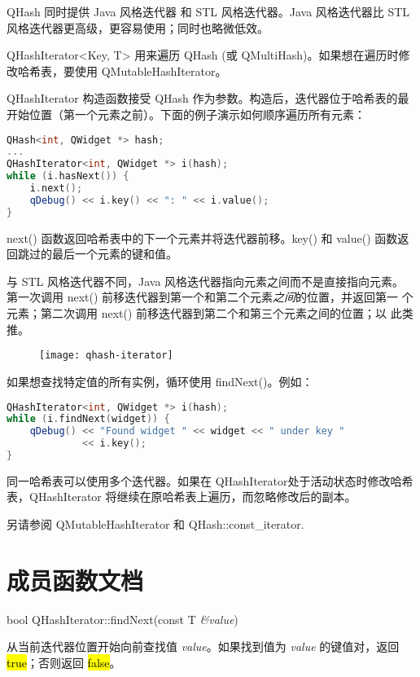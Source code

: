 QHash 同时提供 Java 风格迭代器 和 STL 风格迭代器。Java 风格迭代器比 STL 风格迭代器更高级，更容易使用；同时也略微低效。

QHashIterator<Key, T> 用来遍历 QHash (或 QMultiHash)。如果想在遍历时修改哈希表，要使用 QMutableHashIterator。

QHashIterator 构造函数接受 QHash 作为参数。构造后，迭代器位于哈希表的最开始位置（第一个元素之前）。下面的例子演示如何顺序遍历所有元素：

\begin{lstlisting}[language=C++]
QHash<int, QWidget *> hash;
...
QHashIterator<int, QWidget *> i(hash);
while (i.hasNext()) {
    i.next();
    qDebug() << i.key() << ": " << i.value();
}
\end{lstlisting}

next() 函数返回哈希表中的下一个元素并将迭代器前移。key() 和 value() 函数返回跳过的最后一个元素的键和值。

与 STL 风格迭代器不同，Java 风格迭代器指向元素之间而不是直接指向元素。
第一次调用 next() 前移迭代器到第一个和第二个元素\emph{之间}的位置，并返回第一
个元素；第二次调用 next() 前移迭代器到第二个和第三个元素之间的位置；以
此类推。


\begin{figure}[hbt!]  
	\centering
    \texttt{[image: qhash-iterator]}
\end{figure}

如果想查找特定值的所有实例，循环使用 findNext()。例如：

\begin{lstlisting}[language=C++]
QHashIterator<int, QWidget *> i(hash);
while (i.findNext(widget)) {
    qDebug() << "Found widget " << widget << " under key "
             << i.key();
}
\end{lstlisting}

同一哈希表可以使用多个迭代器。如果在 QHashIterator处于活动状态时修改哈希表，QHashIterator 将继续在原哈希表上遍历，而忽略修改后的副本。

另请参阅 QMutableHashIterator 和 QHash::const\_iterator.

\splitLine

\section{成员函数文档}

bool QHashIterator::findNext(const T \emph{\&value})

从当前迭代器位置开始向前查找值 \emph{value}。如果找到值为 \emph{value} 的键值对，返回 \hl{true}；否则返回 \hl{false}。

